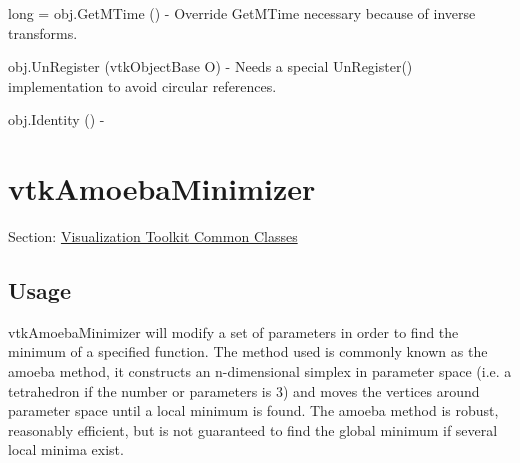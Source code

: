 \begin{DoxyItemize}
\item {\ttfamily long = obj.\-Get\-M\-Time ()} -\/ Override Get\-M\-Time necessary because of inverse transforms.  
\item {\ttfamily obj.\-Un\-Register (vtk\-Object\-Base O)} -\/ Needs a special Un\-Register() implementation to avoid circular references.  
\item {\ttfamily obj.\-Identity ()} -\/  
\end{DoxyItemize}\hypertarget{vtkcommon_vtkamoebaminimizer}{}\section{vtk\-Amoeba\-Minimizer}\label{vtkcommon_vtkamoebaminimizer}
Section\-: \hyperlink{sec_vtkcommon}{Visualization Toolkit Common Classes} \hypertarget{vtkwidgets_vtkxyplotwidget_Usage}{}\subsection{Usage}\label{vtkwidgets_vtkxyplotwidget_Usage}
vtk\-Amoeba\-Minimizer will modify a set of parameters in order to find the minimum of a specified function. The method used is commonly known as the amoeba method, it constructs an n-\/dimensional simplex in parameter space (i.\-e. a tetrahedron if the number or parameters is 3) and moves the vertices around parameter space until a local minimum is found. The amoeba method is robust, reasonably efficient, but is not guaranteed to find the global minimum if several local minima exist.

